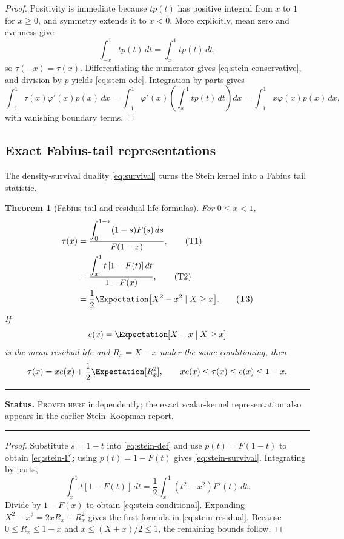 \documentclass[11pt,oneside]{article}
\newtheorem{theorem}{Theorem}[section]
\theoremstyle{definition}
\theoremstyle{remark}
\newenvironment{boxedremark}{%
  \par\smallskip\noindent\begin{center}\begin{minipage}{0.94\textwidth}%
  \color{black}\hrule\vspace{0.6em}\small
}{%
  \vspace{0.6em}\hrule\end{minipage}\end{center}\smallskip
}
\newcommand{\ProvedHere}{\textsc{Proved here}}
\newcommand{\Status}[1]{%
  \begin{boxedremark}\textbf{Status.} #1.\end{boxedremark}}
\begin{document}
\begin{proof}
Positivity is immediate because $t p(t)$ has positive integral from $x$ to $1$
for $x\ge0$, and symmetry extends it to $x<0$.  More explicitly, mean zero and
evenness give
\[
 \int_{-x}^1t p(t)\,dt=\int_x^1t p(t)\,dt,
\]
so $\tau(-x)=\tau(x)$.  Differentiating the numerator gives
\eqref{eq:stein-conservative}, and division by $p$ yields \eqref{eq:stein-ode}.
Integration by parts gives
\[
 \int_{-1}^1\tau(x)\varphi'(x)p(x)\,dx
 =\int_{-1}^1\varphi'(x)\left(\int_x^1t p(t)\,dt\right)dx
 =\int_{-1}^1x\varphi(x)p(x)\,dx,
\]
with vanishing boundary terms.
\end{proof}

\subsection{Exact Fabius-tail representations}
The density-survival duality \eqref{eq:survival} turns the Stein kernel into a
Fabius tail statistic.

\begin{theorem}[Fabius-tail and residual-life formulas]\label{thm:stein-tail}
For $0\le x<1$,
\begin{align}
 \tau(x)
 &=\frac{\displaystyle\int_0^{1-x}(1-s)F(s)\,ds}{F(1-x)},
 \label{eq:stein-F}\tag{T1}\\
 &=\frac{\displaystyle\int_x^1t\,[1-F(t)]\,dt}{1-F(x)},
 \label{eq:stein-survival}\tag{T2}\\
 &=\frac12\Expectation\bigl[X^2-x^2\mid X\ge x\bigr].
 \label{eq:stein-conditional}\tag{T3}
\end{align}
If
\[
 e(x)=\Expectation[X-x\mid X\ge x]
\]
is the mean residual life and $R_x=X-x$ under the same conditioning, then
\begin{equation}\label{eq:stein-residual}
 \tau(x)=x e(x)+\frac12\Expectation[R_x^2],
 \qquad x e(x)\le\tau(x)\le e(x)\le1-x.
\end{equation}
\end{theorem}
\Status{\ProvedHere{} independently; the exact scalar-kernel representation
also appears in the earlier Stein--Koopman report}

\begin{proof}
Substitute $s=1-t$ into \eqref{eq:stein-def} and use $p(t)=F(1-t)$ to obtain
\eqref{eq:stein-F}; using $p(t)=1-F(t)$ gives \eqref{eq:stein-survival}.
Integrating by parts,
\[
 \int_x^1t[1-F(t)]\,dt
 =\frac12\int_x^1(t^2-x^2)F'(t)\,dt.
\]
Divide by $1-F(x)$ to obtain \eqref{eq:stein-conditional}.  Expanding
$X^2-x^2=2xR_x+R_x^2$ gives the first formula in
\eqref{eq:stein-residual}.  Because $0\le R_x\le1-x$ and
$x\le(X+x)/2\le1$, the remaining bounds follow.
\end{proof}
\end{document}
